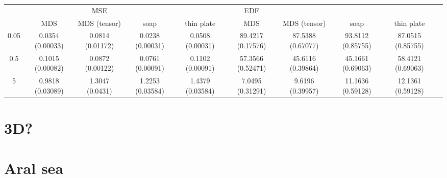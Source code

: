 \documentclass[a4paper,10pt]{article}
\begin{document}
\begin{table}[ht]
\centering
\begin{tabular}{c c c c c c c c c c}
 & & MSE & &  & EDF & \\ 
 & MDS & MDS (tensor) & soap & thin plate & MDS & MDS (tensor) & soap & thin plate\\ 
0.05  & 0.0354 (0.00033) & 0.0814 (0.01172) & 0.0238 (0.00031) &0.0508 (0.00031) &89.4217 (0.17576) & 87.5388 (0.67077) & 93.8112 (0.85755) & 87.0515 (0.85755)\\ 
0.5  & 0.1015 (0.00082) & 0.0872 (0.00122) & 0.0761 (0.00091) &0.1102 (0.00091) &57.3566 (0.52471) & 45.6116 (0.39864) & 45.1661 (0.69063) & 58.4121 (0.69063)\\ 
5  & 0.9818 (0.03089) & 1.3047 (0.0431) & 1.2253 (0.03584) &1.4379 (0.03584) &7.0495 (0.31291) & 9.6196 (0.39957) & 11.1636 (0.59128) & 12.1361 (0.59128)\\ 
\end{tabular}
\end{table}


\section{3D?}

\section{Aral sea}




\end{document}
